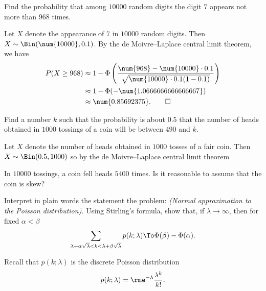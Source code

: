 \begin{problem}[Handout 14, \# 11]
  Find the probability that among \(\num{10000}\) random digits the digit
  \(7\) appears not more than \(968\) times.
\end{problem}
\begin{solution}
  Let \(X\) denote the appearance of \(7\) in \(\num{10000}\) random
  digits. Then \(X\sim\Bin(\num{10000},0.1)\). By the de Moivre--Laplace
  central limit theorem, we have
  \begin{align*}
    P(X\geq 968)
    &\approx 1-\Phi\left(\frac{\num{968}-\num{10000}\cdot 0.1}
      {\sqrt{\num{10000}\cdot 0.1(1-0.1)}}\right)\\
    &\approx 1-\Phi(-\num{1.0666666666666667})\\
    &\approx\num{0.85692375}.\qedhere
  \end{align*}
\end{solution}
\newpage

\begin{problem}[Handout 14, \# 12]
  Find a number \(k\) such that the probability is about \(0.5\) that the
  number of heads obtained in \(\num{1000}\) tossings of a coin will be
  between \(490\) and \(k\).
\end{problem}
\begin{solution}
  Let \(X\) denote the number of heads obtained in \(1000\) tosses of a
  fair coin. Then \(X\sim\Bin(0.5,1000)\) so by the de Moivre--Laplace
  central limit theorem
\end{solution}
\newpage

\begin{problem}[Handout 14, \# 13]
  In \(\num{10000}\) tossings, a coin fell heads \(\num{5400}\) times. Is
  it reasonable to assume that the coin is skew?
\end{problem}
\begin{solution}

\end{solution}
\newpage

\begin{problem}[Handout 14, \# 14]
  Interpret in plain words the statement the problem: \emph{(Normal
    approximation to the Poisson distribution).} Using Stirling's formula,
  show that, if \(\lambda\to\infty\), then for fixed \(\alpha<\beta\)
  \[
    \sum_{\lambda+\alpha\sqrt{\lambda}<k<\lambda+\beta\sqrt{\lambda}}p(k;\lambda)
    \To \Phi(\beta)-\Phi(\alpha).
  \]
\end{problem}
\begin{solution}
  Recall that \(p(k;\lambda)\) is the discrete Poisson distribution
  \[
    p(k;\lambda)=\rme^{-\lambda}\frac{\lambda^k}{k!}.
  \]
\end{solution}
\newpage

